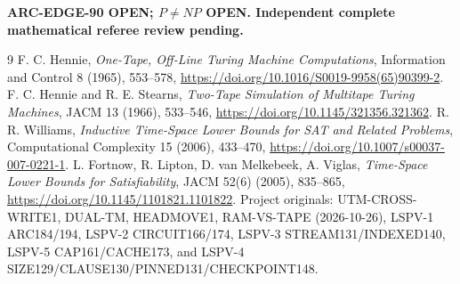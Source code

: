 \documentclass[11pt]{article}
\begin{document}
\noindent\textbf{ARC-EDGE-90 OPEN; $P\ne NP$ OPEN. Independent
complete mathematical referee review pending.}
\begin{thebibliography}{9}
 F. C. Hennie, \emph{One-Tape, Off-Line Turing
Machine Computations}, Information and Control 8 (1965),
553--578, \url{https://doi.org/10.1016/S0019-9958(65)90399-2}.
 F. C. Hennie and R. E. Stearns,
\emph{Two-Tape Simulation of Multitape Turing Machines},
JACM 13 (1966), 533--546,
\url{https://doi.org/10.1145/321356.321362}.
 R. R. Williams,
\emph{Inductive Time-Space Lower Bounds for SAT and
Related Problems}, Computational Complexity 15 (2006),
433--470, \url{https://doi.org/10.1007/s00037-007-0221-1}.
 L. Fortnow, R. Lipton, D. van Melkebeek,
A. Viglas, \emph{Time-Space Lower Bounds for
Satisfiability}, JACM 52(6) (2005), 835--865,
\url{https://doi.org/10.1145/1101821.1101822}.
 Project originals: UTM-CROSS-WRITE1,
DUAL-TM, HEADMOVE1, RAM-VS-TAPE (2026-10-26),
LSPV-1 ARC184/194, LSPV-2 CIRCUIT166/174,
LSPV-3 STREAM131/INDEXED140, LSPV-5 CAP161/CACHE173,
and LSPV-4 SIZE129/CLAUSE130/PINNED131/CHECKPOINT148.
\end{thebibliography}
\end{document}
